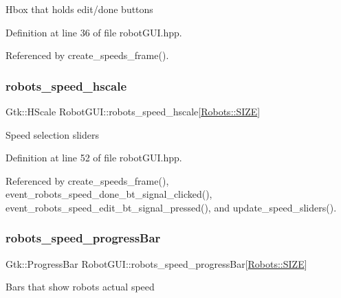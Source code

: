 Hbox that holds edit/done buttons 

Definition at line 36 of file robot\+G\+U\+I.\+hpp.



Referenced by create\+\_\+speeds\+\_\+frame().

\mbox{\label{class_robot_g_u_i_a25c9dbce938a0b6fa4de5c7174d062af}} 
\subsubsection{\texorpdfstring{robots\+\_\+speed\+\_\+hscale}{robots\_speed\_hscale}}
{\footnotesize\ttfamily Gtk\+::\+H\+Scale Robot\+G\+U\+I\+::robots\+\_\+speed\+\_\+hscale\mbox{[}\hyperlink{class_robots_ae9df2f1d345ad6740f0459956cdd4712}{Robots\+::\+S\+I\+ZE}\mbox{]}\hspace{0.3cm}{\ttfamily [private]}}

Speed selection sliders 

Definition at line 52 of file robot\+G\+U\+I.\+hpp.



Referenced by create\+\_\+speeds\+\_\+frame(), event\+\_\+robots\+\_\+speed\+\_\+done\+\_\+bt\+\_\+signal\+\_\+clicked(), event\+\_\+robots\+\_\+speed\+\_\+edit\+\_\+bt\+\_\+signal\+\_\+pressed(), and update\+\_\+speed\+\_\+sliders().

\mbox{\label{class_robot_g_u_i_a2c5103a4c119635536213e8c9dd6fc3f}} 
\subsubsection{\texorpdfstring{robots\+\_\+speed\+\_\+progress\+Bar}{robots\_speed\_progressBar}}
{\footnotesize\ttfamily Gtk\+::\+Progress\+Bar Robot\+G\+U\+I\+::robots\+\_\+speed\+\_\+progress\+Bar\mbox{[}\hyperlink{class_robots_ae9df2f1d345ad6740f0459956cdd4712}{Robots\+::\+S\+I\+ZE}\mbox{]}\hspace{0.3cm}{\ttfamily [private]}}

Bars that show robot\textquotesingle{}s actual speed 


